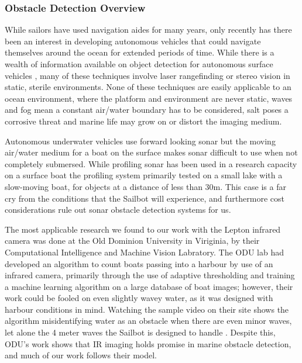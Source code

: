 
\subsubsection{\label{sec:discussion:theory:detectionoverview}Obstacle Detection Overview}
While sailors have used navigation aides for many years, only recently has there been an interest in developing autonomous vehicles that could navigate themselves around the ocean for extended periods of time. While there is a wealth of information available on object detection for autonomous surface vehicles \cite{detection-offroad} \cite{optical-flow-detection} \cite{unmanned-ground-vehicles}, many of these techniques involve laser rangefinding or stereo vision in static, sterile environments. None of these techniques are easily applicable to an ocean environment, where the platform and environment are never static, waves and fog mean a constant air/water boundary has to be considered, salt poses a corrosive threat and marine life may grow on or distort the imaging medium. 

Autonomous underwater vehicles use forward looking sonar but the moving air/water medium for a boat on the surface makes sonar difficult to use when not completely submersed. While profiling sonar has been used in a research capacity on a surface boat\cite{ASV-sonar} the profiling system primarily tested on a small lake with a slow-moving boat, for objects at a distance of less than 30m. This case is a far cry from the conditions that the Sailbot will experience, and furthermore cost considerations rule out sonar obstacle detection systems for us.

The most applicable research we found to our work with the Lepton infrared camera was done at the Old Dominion University in Viriginia, by their Computational Intelligence and Machine Vision Labratory. The ODU lab had developed an algorithm to count boats passing into a harbour by use of an infrared camera, primarily through the use of adaptive thresholding and training a machine learning algorithm on a large database of boat images; however, their work could be fooled on even slightly wavey water, as it was designed with harbour conditions in mind. Watching the sample video on their site shows the algorithm misidentifying water as an obstacle when there are even minor waves, let alone the 4 meter waves the Sailbot is designed to handle \cite{ODU-boat-IR-detection}. Despite this, ODU's work shows that IR imaging holds promise in marine obstacle detection, and much of our work follows their model.


